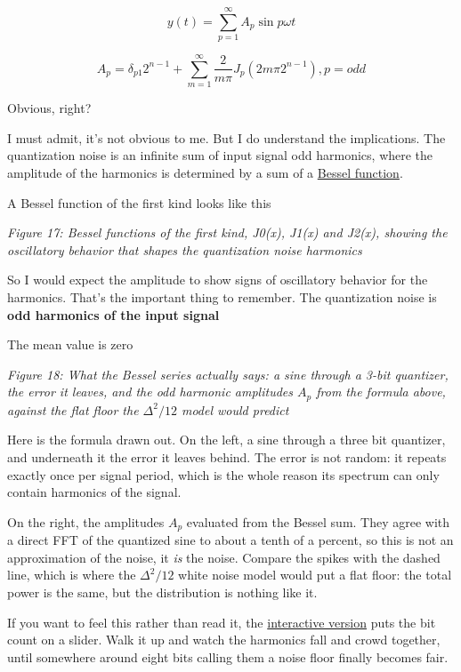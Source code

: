 \[y(t) = \sum_{p=1}^\infty{A_p\sin{p\omega t}}\]

\[ A_p = \delta_{p1}2^{n-1} + \sum_{m=1}^\infty{\frac{2}{m\pi}J_p(2m\pi
  2^{n-1})},  p=odd\]

Obvious, right?

I must admit, it's not obvious to me. But I do understand the
implications. The quantization noise is an infinite sum of input signal
odd harmonics, where the amplitude of the harmonics is determined by a
sum of a
\href{https://en.wikipedia.org/wiki/Bessel_function\#Bessel_functions_of_the_first_kind}{Bessel
function}.

A Bessel function of the first kind looks like this


{
\centering
{}
}

\emph{Figure 17: Bessel functions of the first kind, J0(x), J1(x) and
J2(x), showing the oscillatory behavior that shapes the quantization
noise harmonics}

So I would expect the amplitude to show signs of oscillatory behavior
for the harmonics. That's the important thing to remember. The
quantization noise is \textbf{odd harmonics of the input signal}

The mean value is zero


{
\centering
{}
}

\emph{Figure 18: What the Bessel series actually says: a sine through a
3-bit quantizer, the error it leaves, and the odd harmonic amplitudes
\(A_p\) from the formula above, against the flat floor the
\(\Delta^2/12\) model would predict}

Here is the formula drawn out. On the left, a sine through a three bit
quantizer, and underneath it the error it leaves behind. The error is
not random: it repeats exactly once per signal period, which is the
whole reason its spectrum can only contain harmonics of the signal.

On the right, the amplitudes \(A_p\) evaluated from the Bessel sum. They
agree with a direct FFT of the quantized sine to about a tenth of a
percent, so this is not an approximation of the noise, it \emph{is} the
noise. Compare the spikes with the dashed line, which is where the
\(\Delta^2/12\) white noise model would put a flat floor: the total
power is the same, but the distribution is nothing like it.

If you want to feel this rather than read it, the
\href{https://wulffern.github.io/aic2026/assets/examples/bessel-quantization.html}{interactive
version} puts the bit count on a slider. Walk it up and watch the
harmonics fall and crowd together, until somewhere around eight bits
calling them a noise floor finally becomes fair.

